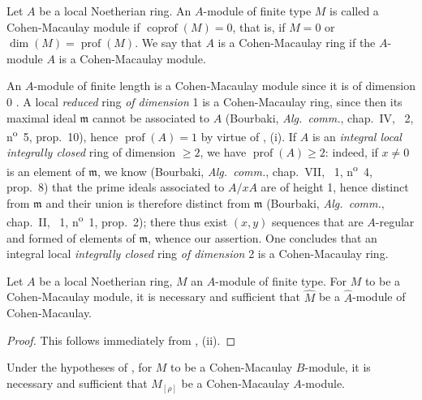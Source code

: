 \begin{definition}[16.5.1]
\label{0.16.5.1}
Let $A$ be a local Noetherian ring.
An $A$-module of finite type $M$ is called a Cohen-Macaulay module if $\operatorname{coprof}(M)=0$, that is, if $M=0$ or $\dim(M)=\operatorname{prof}(M)$.
We say that $A$ is a Cohen-Macaulay ring if the $A$-module $A$ is a Cohen-Macaulay module.
\end{definition}

An $A$-module of finite length is a Cohen-Macaulay module since it is of dimension 0 .
A local \emph{reduced} ring \emph{of dimension} 1 is a Cohen-Macaulay ring, since then its maximal ideal $\mathfrak{m}$ cannot be associated to $A$ (Bourbaki, \emph{Alg.~comm.}, chap.~IV, \textsection~2, n\textsuperscript{o}~5, prop.~10), hence $\operatorname{prof}(A)=1$ by virtue of , (i).
If $A$ is an \emph{integral local integrally closed} ring of dimension $\geq 2$, we have $\operatorname{prof}(A)\geq 2$: indeed, if $x\neq 0$ is an element of $\mathfrak{m}$, we know (Bourbaki, \emph{Alg.~comm.}, chap.~VII, \textsection~1, n\textsuperscript{o}~4, prop.~8) that the prime ideals associated to $A/x A$ are of height 1, hence distinct from $\mathfrak{m}$ and their union is therefore distinct from $\mathfrak{m}$ (Bourbaki, \emph{Alg.~comm.}, chap.~II, \textsection~1, n\textsuperscript{o}~1, prop.~2); there thus exist $(x,y)$ sequences that are $A$-regular and formed of elements of $\mathfrak{m}$, whence our assertion.
One concludes that an integral local \emph{integrally closed} ring \emph{of dimension} 2 is a Cohen-Macaulay ring.

\begin{proposition}[16.5.2]
\label{0.16.5.2}
Let $A$ be a local Noetherian ring, $M$ an $A$-module of finite type.
For $M$ to be a Cohen-Macaulay module, it is necessary and sufficient that $\widehat{M}$ be a $\widehat{A}$-module of Cohen-Macaulay.
\end{proposition}

\begin{proof}
This follows immediately from , (ii).
\end{proof}

\begin{proposition}[16.5.3]
\label{0.16.5.3}
Under the hypotheses of , for $M$ to be a Cohen-Macaulay $B$-module, it is necessary and sufficient that $M_{[\rho]}$ be a Cohen-Macaulay $A$-module.
\end{proposition}

